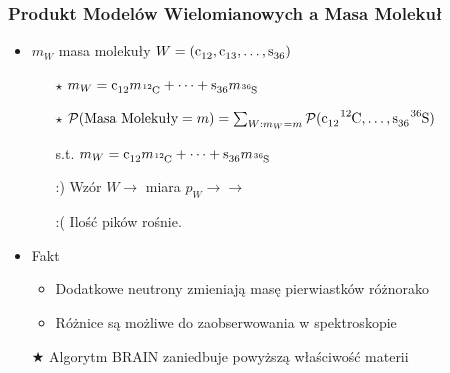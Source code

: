 \documentclass[xetex]{beamer}
\begin{document}
	\begin{frame}\frametitle{{\color{gray}Produkt} Model{\color{gray}ów} Wielomianowy{\color{gray}ch} a Masa Molekuł}
		
		\begin{itemize}
			\item $m_W$ masa molekuły $W = (\cem{c_{12}}, \cem{c_{13}}, \dots, \cem{s_{36}})$ 
			\begin{itemize}
				\item[$\star$] $m_W = \cem{c_{12}} m_\cem{^{12}C} + \dots + \cem{s_{36}} m_\cem{^{36}S}$

				\item[$\star$] $\prob( \text{Masa Molekuły} = m ) = 
					\sum_{W: m_W = m} \prob(
						\cem{c_{12}} \cem{^{12}C}, 
						\dots, 
						\cem{s_{36}} \cem{^{36}S} )$
				\item[s.t.] $m_W = \cem{c_{12}} m_\cem{^{12}C} + \dots + \cem{s_{36}} m_\cem{^{36}S}$
				\item[:)] Wzór $W \rightarrow$ miara $p_W \rightarrow \rightarrow$
				\item[:(] Ilość pików rośnie.  
			\end{itemize}
			\item Fakt
			\begin{itemize}
				\item 	Dodatkowe neutrony zmieniają masę pierwiastków różnorako   
				\item  	Różnice są możliwe do zaobserwowania w spektroskopie
			\end{itemize}
			\item[$\bigstar$] Algorytm BRAIN zaniedbuje powyższą właściwość materii
		\end{itemize}



	\end{frame}
\end{document}
